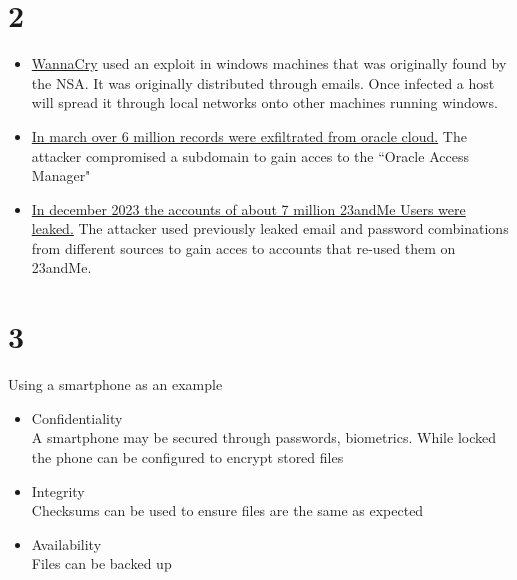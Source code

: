 \documentclass{article}
\begin{document}
	\maketitle
	\section*{2}
	\begin{itemize}
		\item
		    \href{https://arstechnica.com/information-technology/2017/04/10000-windows-computers-may-be-infected-by-advanced-nsa-backdoor/}
				{WannaCry} used an exploit in windows machines that was originally found by the NSA.
			It was originally distributed through emails.
			Once infected a host will spread it through local networks onto other machines running windows.
		\item
			\href{https://www.cloudsek.com/blog/the-biggest-supply-chain-hack-of-2025-6m-records-for-sale-exfiltrated-from-oracle-cloud-affecting-over-140k-tenants#analysis}
			    {In march over 6 million records were exfiltrated from oracle cloud.}
			The attacker compromised a subdomain to gain acces to the ``Oracle Access Manager"
		\item
			\href{https://www.theguardian.com/technology/2023/dec/05/23andme-hack-data-breach}
    			{In december 2023 the accounts of about 7 million 23andMe Users were leaked.}
            The attacker used previously leaked email and password combinations from different sources
            to gain acces to accounts that re-used them on 23andMe.
    \end{itemize}
    \section*{3}
    Using a smartphone as an example
    \begin{itemize}
        \item Confidentiality\\
            A smartphone may be secured through
            passwords, biometrics.
            While locked the phone can be configured to encrypt stored files
        \item Integrity\\
            Checksums can be used to ensure files are the same as expected
        \item Availability\\
            Files can be backed up
    \end{itemize}
\end{document}
